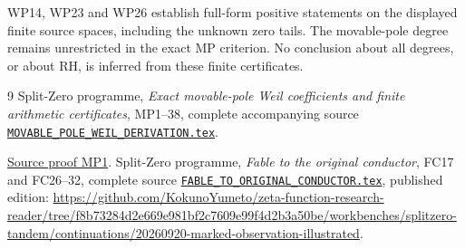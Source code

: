 \documentclass[11pt]{article}
\begin{document}
WP14, WP23 and WP26 establish full-form positive statements on
the displayed finite source spaces, including the unknown
zero tails. The movable-pole degree remains unrestricted in
the exact MP criterion. No conclusion about all degrees, or
about RH, is inferred from these finite certificates.

\begin{thebibliography}{9}
 Split-Zero programme,
\emph{Exact movable-pole Weil coefficients and finite arithmetic
certificates}, MP1--38, complete accompanying source
\href{https://github.com/KokunoYumeto/zeta-function-research-reader/blob/5992ad50c0f2a06921f1fcaded7b4e38097c0739/workbenches/splitzero-tandem/continuations/20260920-original-kernel-mixed-determinants/providers/MOVABLE_POLE_WEIL_DERIVATION.tex\#L1}{\texttt{MOVABLE\_POLE\_WEIL\_DERIVATION.tex}}.

\href{https://github.com/KokunoYumeto/zeta-function-research-reader/blob/5992ad50c0f2a06921f1fcaded7b4e38097c0739/workbenches/splitzero-tandem/continuations/20260920-original-kernel-mixed-determinants/providers/MOVABLE_POLE_WEIL_DERIVATION.tex\#L30}{Source proof MP1}.
 Split-Zero programme,
\emph{Fable to the original conductor}, FC17 and FC26--32,
complete source \href{https://github.com/KokunoYumeto/zeta-function-research-reader/blob/5992ad50c0f2a06921f1fcaded7b4e38097c0739/workbenches/splitzero-tandem/continuations/20260920-original-kernel-mixed-determinants/providers/FABLE_TO_ORIGINAL_CONDUCTOR.tex\#L1}{\texttt{FABLE\_TO\_ORIGINAL\_CONDUCTOR.tex}},
published edition:
\url{https://github.com/KokunoYumeto/zeta-function-research-reader/tree/f8b73284d2e669e981bf2c7609e99f4d2b3a50be/workbenches/splitzero-tandem/continuations/20260920-marked-observation-illustrated}.


\end{thebibliography}
\end{document}
